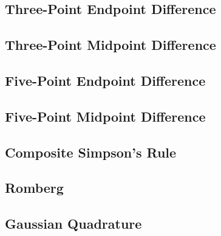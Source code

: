 \documentclass{article}
\begin{document}
\subsection*{Three-Point Endpoint Difference}

\subsection*{Three-Point Midpoint Difference}

\subsection*{Five-Point Endpoint Difference}

\subsection*{Five-Point Midpoint Difference}

\subsection*{Composite Simpson's Rule}

\subsection*{Romberg}

\subsection*{Gaussian Quadrature}

\end{document}
